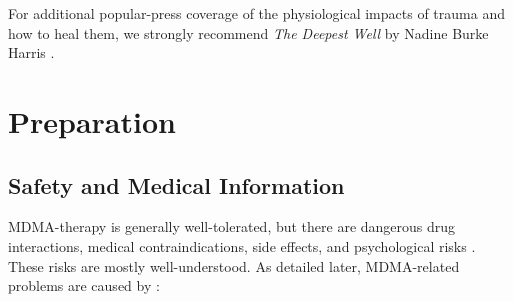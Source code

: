 \documentclass[12pt,letterpaper]{book}
\begin{document}
For additional popular-press coverage of the physiological impacts of trauma and how to heal them, we strongly recommend \textit{The Deepest Well} by Nadine Burke Harris \cite{harris2018deepest}.
\chapter{Preparation}
\section{Safety and Medical Information}
\label{sec:safety}
MDMA-therapy is generally well-tolerated, but there are dangerous drug interactions, medical contraindications, side effects, and psychological risks \cite{wolfgang2025}. These risks are mostly well-understood. As detailed later, MDMA-related problems are caused by \cite{wolfgang2025,riggDeaths,roxburghDeaths}:
\end{document}
